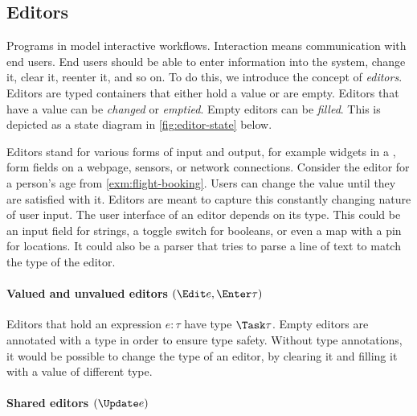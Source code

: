 \subsection{Editors}

Programs in \TOPHAT model interactive workflows.
Interaction means communication with end users.
End users should be able to enter information into the system, change it, clear it, reenter it, and so on.
To do this, we introduce the concept of \emph{editors}.
%
Editors are typed containers that either hold a value or are empty.
Editors that have a value can be \emph{changed} or \emph{emptied}.
Empty editors can be \emph{filled}.
This is depicted as a state diagram in \cref{fig:editor-state} below.


Editors stand for various forms of input and output, for example widgets in a \GUI, form fields on a webpage, sensors, or network connections.
%
Consider the editor for a person's age from \cref{exm:flight-booking}.
Users can change the value until they are satisfied with it.
Editors are meant to capture this constantly changing nature of user input.
%
The user interface of an editor depends on its type.
This could be an input field for strings, a toggle switch for booleans, or even a map with a pin for locations.
It could also be a parser that tries to parse a line of text to match the type of the editor.


\paragraph{Valued and unvalued editors $(\Edit e, \Enter \tau)$}

Editors that hold an expression $e : \tau$ have type $\Task \tau$.
Empty editors are annotated with a type in order to ensure type safety.
Without type annotations, it would be possible to change the type of an editor, by clearing it and filling it with a value of different type.

\paragraph{Shared editors $(\Update e)$}

